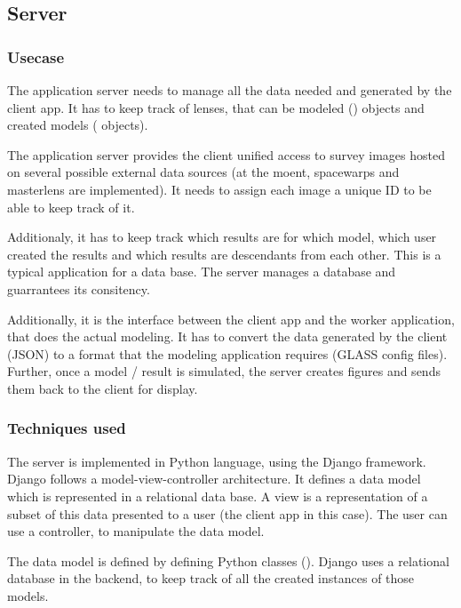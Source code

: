 \subsection{Server}
\label{sec:server}

\subsubsection{Usecase}
The application server needs to manage all the data needed and generated by the client app.
It has to keep track of lenses, that can be modeled () objects and created models ( objects).

The application server provides the client unified access to survey images hosted on several possible external data sources (at the moent, spacewarps and masterlens are implemented). It needs to assign each image a unique ID to be able to keep track of it.

Additionaly, it has to keep track which results are for which model, which user created the results and which results are descendants from each other.
This is a typical application for a data base.
The server manages a database and guarrantees its consitency.

Additionally, it is the interface between the client app and the worker application, that does the actual modeling. It has to convert the data generated by the client (JSON) to a format that the modeling application requires (GLASS config files).
Further, once a model / result is simulated, the server creates figures and sends them back to the client for display.



\subsubsection{Techniques used}

The server is implemented in Python language, using the Django framework. Django follows a model-view-controller architecture.
It defines a data model which is represented in a relational data base.
A view is a representation of a subset of this data presented to a user (the client app in this case).
The user can use a controller, to manipulate the data model.

The data model is defined by defining Python classes (). Django uses a relational database in the backend, to keep track of all the created instances of those models.

